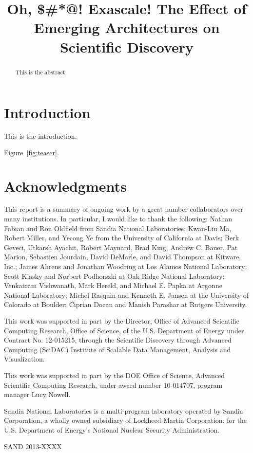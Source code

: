 \documentclass[conference]{IEEEtran}
\author{
  \IEEEauthorblockN{
    Kenneth~Moreland\IEEEauthorrefmark{1}
  }
  \IEEEauthorblockA{
    \IEEEauthorrefmark{1}Sandia National Laboratories,
    Albuquerque, NM 87185-1326}
}
\title{Oh, \$\#*@! Exascale! The Effect of Emerging Architectures on
  Scientific Discovery}
\begin{document}
\sloppy

\maketitle


\begin{abstract}
  This is the abstract.
\end{abstract}

\section{Introduction}
\label{sec:Introduction}

This is the introduction.

Figure~\ref{fig:teaser}.

\section*{Acknowledgments}

\noindent
This report is a summary of ongoing work by a great number collaborators
over many institutions.  In particular, I would like to thank the
following: Nathan Fabian and Ron Oldfield from Sandia National
Laboratories; Kwan-Liu Ma, Robert Miller, and Yecong Ye from the University
of California at Davis; Berk Geveci, Utkarsh Ayachit, Robert Maynard, Brad
King, Andrew C. Bauer, Pat Marion, Sebastien Jourdain, David DeMarle, and
David Thompson at Kitware, Inc.; James Ahrens and Jonathan Woodring at Los
Alamos National Laboratory; Scott Klasky and Norbert Podhorszki at Oak
Ridge National Laboratory; Venkatram Vishwanath, Mark Hereld, and Michael
E. Papka at Argonne National Laboratory; Michel Rasquin and Kenneth
E. Jansen at the University of Colorado at Boulder; Ciprian Docan and
Manish Parashar at Rutgers University.


This work was supported in part by the Director, Office of Advanced
Scientific Computing Research, Office of Science, of the U.S. Department of
Energy under Contract No. 12-015215, through the Scientific Discovery
through Advanced Computing (SciDAC) Institute of Scalable Data Management,
Analysis and Visualization.

This work was supported in part by the DOE Office of Science, Advanced
Scientific Computing Research, under award number 10-014707, program
manager Lucy Nowell.

Sandia National Laboratories is a multi-program laboratory operated by
Sandia Corporation, a wholly owned subsidiary of Lockheed Martin
Corporation, for the U.S. Department of Energy's National Nuclear Security
Administration.

\noindent
{\small SAND 2013-XXXX}

\end{document}
